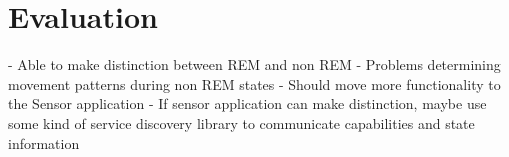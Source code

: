 \chapter{Evaluation} %
\label{cha:evaluation}
- Able to make distinction between REM and non REM
- Problems determining movement patterns during non REM states
- Should move more functionality to the Sensor application
- If sensor application can make distinction, maybe use some kind of service discovery library to communicate capabilities and state information

